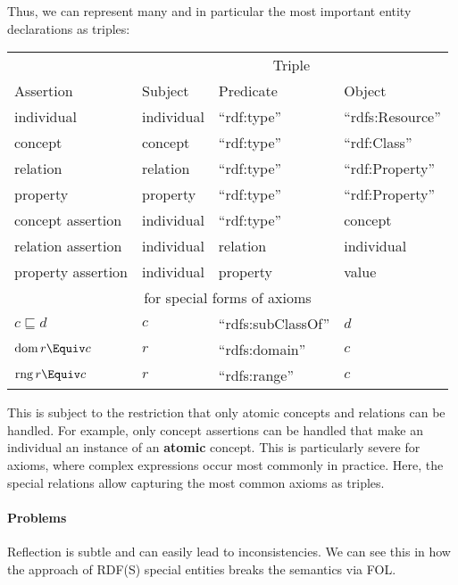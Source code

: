 Thus, we can represent many and in particular the most important entity declarations as triples:
\begin{center}
\begin{tabular}{llll}
\toprule
	& \multicolumn{3}{c}{Triple} \\
\cmidrule(r){2-4}
Assertion & Subject & Predicate & Object \\
\midrule
individual & individual & \enquote{rdf:type} & \enquote{rdfs:Resource} \\
concept  & concept & \enquote{rdf:type} & \enquote{rdf:Class} \\
relation & relation & \enquote{rdf:type} & \enquote{rdf:Property} \\
property & property & \enquote{rdf:type} & \enquote{rdf:Property} \\
concept assertion  & individual & \enquote{rdf:type} & concept \\
relation assertion & individual & relation & individual \\
property assertion & individual & property & value \\
\midrule
\multicolumn{4}{c}{for special forms of axioms}\\
\addlinespace
$c\sqsubseteq d$ & $c$ & \enquote{rdfs:subClassOf} & $d$ \\
$\dom\,r\Equiv c$ & $r$ & \enquote{rdfs:domain} & $c$ \\
$\rng\, r\Equiv c$ & $r$ & \enquote{rdfs:range} & $c$ \\
\bottomrule
\end{tabular}
\end{center}

This is subject to the restriction that only atomic concepts and relations can be handled.
For example, only concept assertions can be handled that make an individual an instance of an \textbf{atomic} concept.
This is particularly severe for axioms, where complex expressions occur most commonly in practice.
Here, the special relations allow capturing the most common axioms as triples.

\paragraph{Problems}
Reflection is subtle and can easily lead to inconsistencies.
We can see this in how the approach of RDF(S) special entities breaks the semantics via FOL.

